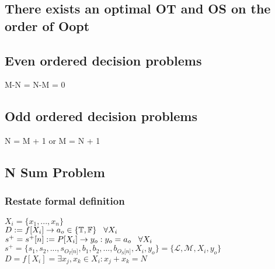 \documentclass[11pt]{article}
\begin{document}
\subsection{There exists an optimal OT and OS on the order of Oopt}

\subsection{Even ordered decision problems}
M-N = N-M = 0
\subsection{Odd ordered decision problems}
N = M + 1 or M = N + 1









\newpage
\subsection{N Sum Problem}

\subsubsection{Restate formal definition}
\begin{center}
\vspace{1.5mm}
$
X_i = \{x_1,...,x_n\}
$
\\ \vspace{2mm}
$
D := f \lbrack X_i \rbrack \rightarrow a_{o} \in \{\mathbb{T}, \mathbb{F}\} \hspace{3mm} \forall X_i
$
\\ \vspace{2mm}
$
s^+ = s^+\lbrack n \rbrack := P \lbrack X_i \rbrack \rightarrow y_{o} : y_o = a_{o} \hspace{3mm} \forall X_i
$
\\ \vspace{2mm}
$
s^+ = \{ s_1,s_2,...,s_{O_T \lbrack n \rbrack }, b_1, b_2,...,b_{O_S \lbrack n \rbrack},X_i,y_o \} = \{ \mathcal{L},\mathcal{M},X_i,y_o\}
$
\\ \vspace{6mm}
$
D = f[X_i] = \exists x_j,x_k \in X_i : x_j + x_k = N
$
\end{center}
\end{document}
